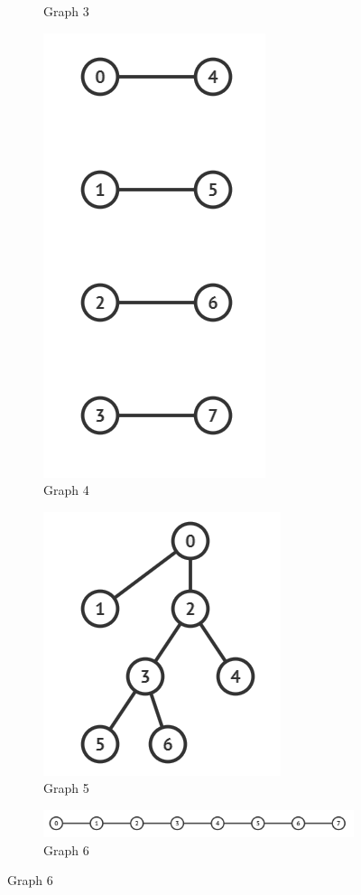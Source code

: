\documentclass[12pt, a4paper]{article}
\begin{document}
\begin{figure}[h]
\begin{subfigure}[t]{.3\linewidth}
			\caption{Graph 3}
		\end{subfigure}
		\begin{subfigure}[t]{.5\linewidth}
			\centering
			\includegraphics[scale=0.4]{G3.png}
			\caption{Graph 4}
		\end{subfigure}
		\begin{subfigure}[t]{.5\linewidth}
			\centering
			\includegraphics[scale=0.6]{G6.png}
			\caption{Graph 5}
		\end{subfigure}
		\begin{subfigure}[t]{1\linewidth}
			\centering
			\includegraphics[scale=0.6]{G5.png}
			\caption{Graph 6}
		\end{subfigure}
	\end{figure}
\end{document}
